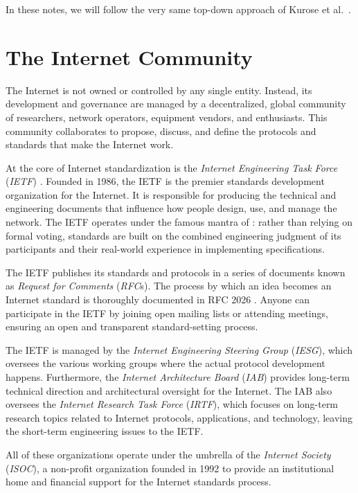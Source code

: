 In these notes, we will follow the very same top-down approach of Kurose et al.~\cite{kurose2017}.

\section{The Internet Community}
The Internet is not owned or controlled by any single entity. Instead, its development and governance are managed by a decentralized, global community of researchers, network operators, equipment vendors, and enthusiasts. This community collaborates to propose, discuss, and define the protocols and standards that make the Internet work.

At the core of Internet standardization is the \emph{Internet Engineering Task Force} (\emph{IETF}) \cite{rfc3935}. Founded in 1986, the IETF is the premier standards development organization for the Internet. It is responsible for producing the technical and engineering documents that influence how people design, use, and manage the network. The IETF operates under the famous mantra of  \cite{rfc3935}: rather than relying on formal voting, standards are built on the combined engineering judgment of its participants and their real-world experience in implementing specifications.

The IETF publishes its standards and protocols in a series of documents known as \emph{Request for Comments} (\emph{RFC}s). The process by which an idea becomes an Internet standard is thoroughly documented in RFC 2026 \cite{rfc2026}. Anyone can participate in the IETF by joining open mailing lists or attending meetings, ensuring an open and transparent standard-setting process. 

The IETF is managed by the \emph{Internet Engineering Steering Group} (\emph{IESG}), which oversees the various working groups where the actual protocol development happens. Furthermore, the \emph{Internet Architecture Board} (\emph{IAB}) provides long-term technical direction and architectural oversight for the Internet. The IAB also oversees the \emph{Internet Research Task Force} (\emph{IRTF}), which focuses on long-term research topics related to Internet protocols, applications, and technology, leaving the short-term engineering issues to the IETF.

All of these organizations operate under the umbrella of the \emph{Internet Society} (\emph{ISOC}), a non-profit organization founded in 1992 to provide an institutional home and financial support for the Internet standards process.

